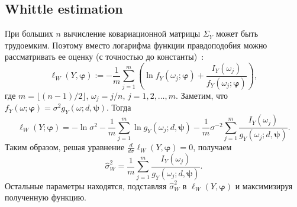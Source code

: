 \documentclass[specialist,
substylefile = spbu_report.rtx,
subf,href,colorlinks=true, 12pt]{disser}
\theoremstyle{definition}
\begin{document}
\subsection{Whittle estimation}
При больших $n$ вычисление ковариационной матрицы $\Sigma_Y$ может быть трудоемким. Поэтому вместо логарифма функции правдоподобия можно рассматривать ее оценку (с точностью до константы)~\cite{Whittle1953}:
\[
	\ell_W(Y, \bm\varphi):=-\frac1m\sum_{j=1}^m\left(\ln f_Y(\omega_j; \bm\varphi) + \frac{I_Y(\omega_j)}{f_Y(\omega_j; \bm\varphi)}\right),
\]
где $m=\lfloor(n-1)/2\rfloor$, $\omega_j = j / n$, $j=1,2,\ldots,m$. Заметим, что $f_Y(\omega; \bm\varphi)=\sigma^2 g_Y(\omega; d, \bm\psi)$. Тогда
\[
	\ell_W(Y; \bm\varphi)=-\ln\sigma^2 - \frac1m \sum_{j=1}^m\ln g_Y(\omega_j; d, \bm\psi) - \frac1m\sigma^{-2} \sum_{j=1}^m\frac{I_Y(\omega_j)}{g_Y(\omega_j; d, \bm\psi)}.
\]
Таким образом, решая уравнение $\frac{d}{d \sigma}\ell_W(Y, \bm\varphi)=0$, получаем
\[
	\widehat\sigma_W^2=\frac1m \sum_{j=1}^m\frac{I_Y(\omega_j)}{g_Y(\omega_j; d, \bm\psi)}.
\]
Остальные параметры находятся, подставляя $\widehat\sigma^2_W$ в $\ell_W(Y, \bm\varphi)$ и максимизируя полученную функцию.



\end{document}
